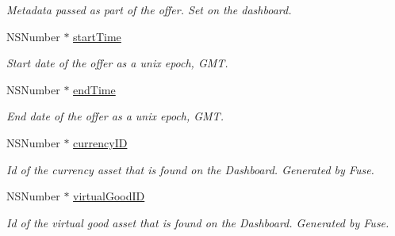 \begin{DoxyCompactItemize}
\begin{DoxyCompactList}\small\item\em Metadata passed as part of the offer. Set on the dashboard. \end{DoxyCompactList}\item 
\hypertarget{interface_fuse_virtual_goods_offer_object_a498e28eb1d66c5f180a7c5b1821fa7de}{}N\+S\+Number $\ast$ \hyperlink{interface_fuse_virtual_goods_offer_object_a498e28eb1d66c5f180a7c5b1821fa7de}{start\+Time}\label{interface_fuse_virtual_goods_offer_object_a498e28eb1d66c5f180a7c5b1821fa7de}

\begin{DoxyCompactList}\small\item\em Start date of the offer as a unix epoch, G\+M\+T. \end{DoxyCompactList}\item 
\hypertarget{interface_fuse_virtual_goods_offer_object_a25d920dd9d75005ff4a80ea4cf1b8d53}{}N\+S\+Number $\ast$ \hyperlink{interface_fuse_virtual_goods_offer_object_a25d920dd9d75005ff4a80ea4cf1b8d53}{end\+Time}\label{interface_fuse_virtual_goods_offer_object_a25d920dd9d75005ff4a80ea4cf1b8d53}

\begin{DoxyCompactList}\small\item\em End date of the offer as a unix epoch, G\+M\+T. \end{DoxyCompactList}\item 
\hypertarget{interface_fuse_virtual_goods_offer_object_a1fd418f96df073f01dee40a326293059}{}N\+S\+Number $\ast$ \hyperlink{interface_fuse_virtual_goods_offer_object_a1fd418f96df073f01dee40a326293059}{currency\+I\+D}\label{interface_fuse_virtual_goods_offer_object_a1fd418f96df073f01dee40a326293059}

\begin{DoxyCompactList}\small\item\em Id of the currency asset that is found on the Dashboard. Generated by Fuse. \end{DoxyCompactList}\item 
\hypertarget{interface_fuse_virtual_goods_offer_object_ad8734bced746bbf3996998eaa788121f}{}N\+S\+Number $\ast$ \hyperlink{interface_fuse_virtual_goods_offer_object_ad8734bced746bbf3996998eaa788121f}{virtual\+Good\+I\+D}\label{interface_fuse_virtual_goods_offer_object_ad8734bced746bbf3996998eaa788121f}

\begin{DoxyCompactList}\small\item\em Id of the virtual good asset that is found on the Dashboard. Generated by Fuse. \end{DoxyCompactList}\end{DoxyCompactItemize}


